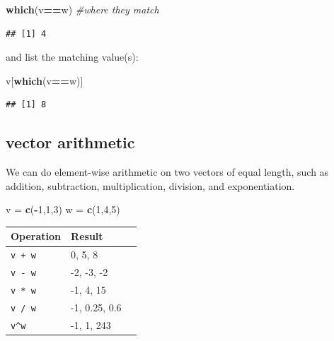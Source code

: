 \documentclass[
]{book}
\newenvironment{Shaded}{\begin{snugshade}}{\end{snugshade}}
\newcommand{\CommentTok}[1]{\textcolor[rgb]{0.56,0.35,0.01}{\textit{#1}}}
\newcommand{\DecValTok}[1]{\textcolor[rgb]{0.00,0.00,0.81}{#1}}
\newcommand{\FunctionTok}[1]{\textcolor[rgb]{0.13,0.29,0.53}{\textbf{#1}}}
\newcommand{\NormalTok}[1]{#1}
\newcommand{\OtherTok}[1]{\textcolor[rgb]{0.56,0.35,0.01}{#1}}
\newcommand{\SpecialCharTok}[1]{\textcolor[rgb]{0.81,0.36,0.00}{\textbf{#1}}}
\theoremstyle{definition}
\theoremstyle{definition}
\theoremstyle{definition}
\theoremstyle{definition}
\theoremstyle{remark}
\begin{document}
\begin{Shaded}
\begin{Highlighting}[]
\FunctionTok{which}\NormalTok{(v}\SpecialCharTok{==}\NormalTok{w) }\CommentTok{\#where they match}
\end{Highlighting}
\end{Shaded}

\begin{verbatim}
## [1] 4
\end{verbatim}

and list the matching value(s):

\begin{Shaded}
\begin{Highlighting}[]
\NormalTok{v[}\FunctionTok{which}\NormalTok{(v}\SpecialCharTok{==}\NormalTok{w)] }
\end{Highlighting}
\end{Shaded}

\begin{verbatim}
## [1] 8
\end{verbatim}

\subsection*{vector arithmetic}\label{vector-arithmetic}

We can do element-wise arithmetic on two vectors of equal length, such as addition, subtraction, multiplication, division, and exponentiation.

\begin{Shaded}
\begin{Highlighting}[]
\NormalTok{v }\OtherTok{=} \FunctionTok{c}\NormalTok{(}\SpecialCharTok{{-}}\DecValTok{1}\NormalTok{,}\DecValTok{1}\NormalTok{,}\DecValTok{3}\NormalTok{)}
\NormalTok{w }\OtherTok{=} \FunctionTok{c}\NormalTok{(}\DecValTok{1}\NormalTok{,}\DecValTok{4}\NormalTok{,}\DecValTok{5}\NormalTok{)}
\end{Highlighting}
\end{Shaded}

\begin{longtable}[]{@{}lll@{}}
\toprule\noalign{}
Operation & Result & \\
\midrule\noalign{}
\endhead
\bottomrule\noalign{}
\endlastfoot
\texttt{v\ +\ w} & 0, 5, 8 & \\
\texttt{v\ -\ w} & -2, -3, -2 & \\
\texttt{v\ *\ w} & -1, 4, 15 & \\
\texttt{v\ /\ w} & -1, 0.25, 0.6 & \\
\texttt{v\^{}w} & -1, 1, 243 & \\
\end{longtable}
\end{document}
